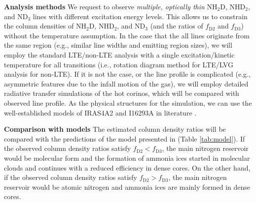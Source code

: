 \documentclass[12pt,a4paper]{article}  %
\begin{document}
\smallskip
\noindent \textbf{Analysis methods} \quad We request to observe \emph{multiple, optically thin} NH$_2$D, NHD$_2$, and ND$_3$ lines with different excitation energy levels. This allows us to constrain the column densities of NH$_2$D, NHD$_2$, and ND$_3$ (and the ratios of $f_\mathrm{D2}$ and $f_\mathrm{D3}$) without the temperature assumption. In the case that the all lines originate from the same region (e.g., similar line widths and emitting region sizes), we will employ the standard LTE/non-LTE analysis with a single excitation/kinetic temperature for all transitions (i.e., rotation diagram method for LTE/LVG analysis for non-LTE). If it is not the case, or the line profile is complicated (e.g., asymmetric features due to the infall motion of the gas), we will employ detailed radiative transfer simulations of the hot corinos, which will be compared with observed line profile. As the physical structures for the simulation, we can use the well-established models of IRAS4A2 and I16293A in literature \citep[e.g.,][]{Persson16, Jacobsen18}. %

\smallskip
\noindent \textbf{Comparison with models} \quad The estimated column density ratios will be compared with the predictions of the model presented in \citet{Furuya18} (Table \ref{tab:model}). 
If the observed column density ratios satisfy $f_\mathrm{D2} < f_\mathrm{D3}$, the main nitrogen reservoir would be molecular form and the formation of ammonia ices started in molecular clouds and continues with a reduced efficiency in dense cores. On the other hand, if the observed column density ratios satisfy $f_\mathrm{D2} > f_\mathrm{D3}$, the main nitrogen reservoir would be atomic nitrogen and ammonia ices are mainly formed in dense cores.  
\end{document}
